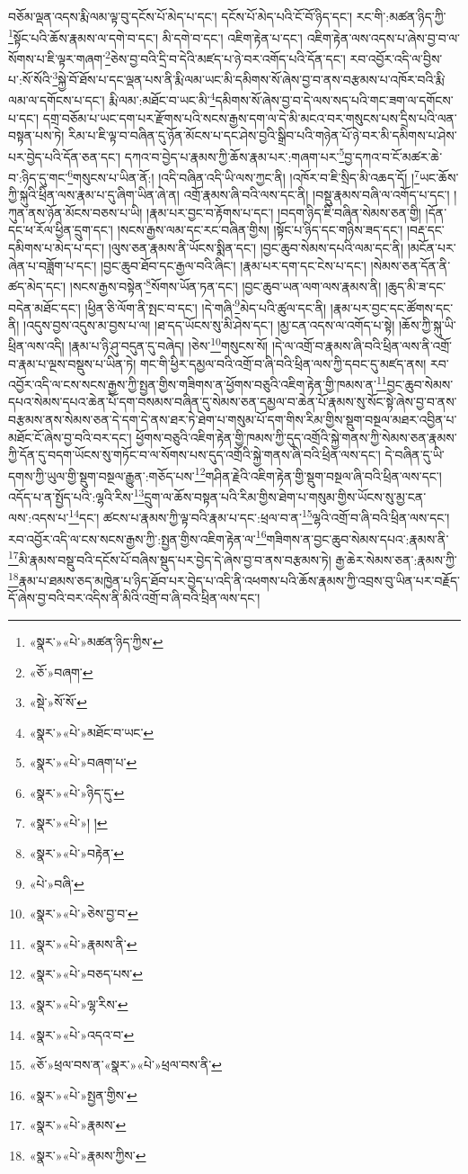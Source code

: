བཅོམ་ལྡན་འདས་རྨི་ལམ་ལྟ་བུ་དངོས་པོ་མེད་པ་དང་། དངོས་པོ་མེད་པའི་ངོ་བོ་ཉིད་དང་། རང་གི་:མཚན་ཉིད་ཀྱི་\footnote{«སྣར་»«པེ་»མཚན་ཉིད་ཀྱིས་}སྟོང་པའི་ཆོས་རྣམས་ལ་དགེ་བ་དང་། མི་དགེ་བ་དང་། འཇིག་རྟེན་པ་དང་། འཇིག་རྟེན་ལས་འདས་པ་ཞེས་བྱ་བ་ལ་སོགས་པ་ཇི་ལྟར་གཞག་\footnote{«ཅོ་»བཞག་}ཅེས་བྱ་བའི་དྲི་བ་དེའི་མཛད་པ་ཉེ་བར་འགོད་པའི་དོན་དང་། རབ་འབྱོར་འདི་ལ་བྱིས་པ་:སོ་སོའི་\footnote{«སྡེ་»སོ་སོ་}སྐྱེ་བོ་ཐོས་པ་དང་ལྡན་པས་ནི་རྨི་ལམ་ཡང་མི་དམིགས་སོ་ཞེས་བྱ་བ་ནས་བརྩམས་པ་འཁོར་བའི་རྨི་ལམ་ལ་དགོངས་པ་དང་། རྨི་ལམ་:མཐོང་བ་ཡང་མི་\footnote{«སྣར་»«པེ་»མཐོང་བ་ཡང་}དམིགས་སོ་ཞེས་བྱ་བ་དེ་ལས་སད་པའི་གང་ཟག་ལ་དགོངས་པ་དང་། དགྲ་བཅོམ་པ་ཡང་དག་པར་རྫོགས་པའི་སངས་རྒྱས་དག་ལ་དེ་མི་མངའ་བར་གསུངས་པས་དྲིས་པའི་ལན་བསྟན་པས་ཏེ། རིམ་པ་ཇི་ལྟ་བ་བཞིན་དུ་ཉོན་མོངས་པ་དང་ཤེས་བྱའི་སྒྲིབ་པའི་གཉེན་པོ་ཉེ་བར་མི་དམིགས་པ་ཤེས་པར་བྱེད་པའི་དོན་ཅན་དང་། དཀའ་བ་བྱེད་པ་རྣམས་ཀྱི་ཆོས་རྣམ་པར་:གཞག་པར་\footnote{«སྣར་»«པེ་»བཞག་པ་}བྱ་དཀའ་བ་ངོ་མཚར་ཆེ་བ་:ཉིད་དུ་གང་\footnote{«སྣར་»«པེ་»ཉིད་དུ་}གསུངས་པ་ཡིན་ནོ:། །འདི་བཞིན་འདི་ཡི་ལས་ཀྱང་ནི། །འཁོར་བ་ཇི་སྲིད་མི་འཆད་དོ། །\footnote{«སྣར་»«པེ་»། །}ཡང་ཆོས་ཀྱི་སྐུའི་ཕྲིན་ལས་རྣམ་པ་དུ་ཞིག་ཡིན་ཞེ་ན། འགྲོ་རྣམས་ཞི་བའི་ལས་དང་ནི། །བསྡུ་རྣམས་བཞི་ལ་འགོད་པ་དང་། །ཀུན་ནས་ཉོན་མོངས་བཅས་པ་ཡི། །རྣམ་པར་བྱང་བ་རྟོགས་པ་དང་། །བདག་ཉིད་ཇི་བཞིན་སེམས་ཅན་གྱི། །དོན་དང་ཕ་རོལ་ཕྱིན་དྲུག་དང་། །སངས་རྒྱས་ལམ་དང་རང་བཞིན་གྱིས། །སྟོང་པ་ཉིད་དང་གཉིས་ཟད་དང་། །བརྡ་དང་དམིགས་པ་མེད་པ་དང་། །ལུས་ཅན་རྣམས་ནི་ཡོངས་སྨིན་དང་། །བྱང་ཆུབ་སེམས་དཔའི་ལམ་དང་ནི། །མངོན་པར་ཞེན་པ་བཟློག་པ་དང་། །བྱང་ཆུབ་ཐོབ་དང་རྒྱལ་བའི་ཞིང་། །རྣམ་པར་དག་དང་ངེས་པ་དང་། །སེམས་ཅན་དོན་ནི་ཚད་མེད་དང་། །སངས་རྒྱས་བསྟེན་\footnote{«སྣར་»«པེ་»བརྟེན་}སོགས་ཡོན་ཏན་དང་། །བྱང་ཆུབ་ཡན་ལག་ལས་རྣམས་ནི། །ཆུད་མི་ཟ་དང་བདེན་མཐོང་དང་། །ཕྱིན་ཅི་ལོག་ནི་སྤང་བ་དང་། །དེ་གཞི་\footnote{«པེ་»བཞི་}མེད་པའི་ཚུལ་དང་ནི། །རྣམ་པར་བྱང་དང་ཚོགས་དང་ནི། །འདུས་བྱས་འདུས་མ་བྱས་པ་ལ། །ཐ་དད་ཡོངས་སུ་མི་ཤེས་དང་། །མྱ་ངན་འདས་ལ་འགོད་པ་སྟེ། །ཆོས་ཀྱི་སྐུ་ཡི་ཕྲིན་ལས་འདི། །རྣམ་པ་ཉི་ཤུ་བདུན་དུ་བཞེད། །ཅེས་\footnote{«སྣར་»«པེ་»ཅེས་བྱ་བ་}གསུངས་སོ། །དེ་ལ་འགྲོ་བ་རྣམས་ཞི་བའི་ཕྲིན་ལས་ནི་འགྲོ་བ་རྣམ་པ་ལྔས་བསྡུས་པ་ཡིན་ཏེ། གང་གི་ཕྱིར་དམྱལ་བའི་འགྲོ་བ་ཞི་བའི་ཕྲིན་ལས་ཀྱི་དབང་དུ་མཛད་ནས། རབ་འབྱོར་འདི་ལ་ངས་སངས་རྒྱས་ཀྱི་སྤྱན་གྱིས་གཟིགས་ན་ཕྱོགས་བཅུའི་འཇིག་རྟེན་གྱི་ཁམས་ན་\footnote{«སྣར་»«པེ་»རྣམས་ནི་}བྱང་ཆུབ་སེམས་དཔའ་སེམས་དཔའ་ཆེན་པོ་དག་བསམས་བཞིན་དུ་སེམས་ཅན་དམྱལ་བ་ཆེན་པོ་རྣམས་སུ་སོང་སྟེ་ཞེས་བྱ་བ་ནས་བརྩམས་ནས་སེམས་ཅན་དེ་དག་དེ་ནས་ཐར་ཏེ་ཐེག་པ་གསུམ་པོ་དག་གིས་རིམ་གྱིས་སྡུག་བསྔལ་མཐར་འབྱིན་པ་མཐོང་ངོ་ཞེས་བྱ་བའི་བར་དང་། ཕྱོགས་བཅུའི་འཇིག་རྟེན་གྱི་ཁམས་ཀྱི་དུད་འགྲོའི་སྐྱེ་གནས་ཀྱི་སེམས་ཅན་རྣམས་ཀྱི་དོན་དུ་བདག་ཡོངས་སུ་གཏོང་བ་ལ་སོགས་པས་དུད་འགྲོའི་སྐྱེ་གནས་ཞི་བའི་ཕྲིན་ལས་དང་། དེ་བཞིན་དུ་ཡི་དགས་ཀྱི་ཡུལ་གྱི་སྡུག་བསྔལ་རྒྱུན་:གཅོད་པས་\footnote{«སྣར་»«པེ་»བཅད་པས་}གཤིན་རྗེའི་འཇིག་རྟེན་གྱི་སྡུག་བསྔལ་ཞི་བའི་ཕྲིན་ལས་དང་། འདོད་པ་ན་སྤྱོད་པའི་:ལྷའི་རིས་\footnote{«སྣར་»«པེ་»ལྷ་རིས་}དྲུག་ལ་ཆོས་བསྟན་པའི་རིམ་གྱིས་ཐེག་པ་གསུམ་གྱིས་ཡོངས་སུ་མྱ་ངན་ལས་:འདས་པ་\footnote{«སྣར་»«པེ་»འདའ་བ་}དང་། ཚངས་པ་རྣམས་ཀྱི་ལྟ་བའི་རྣམ་པ་དང་:ཕྲལ་བ་ན་\footnote{«ཅོ་»ཕྲལ་བས་ན་«སྣར་»«པེ་»ཕྲལ་བས་ནི་}ལྷའི་འགྲོ་བ་ཞི་བའི་ཕྲིན་ལས་དང་། རབ་འབྱོར་འདི་ལ་ངས་སངས་རྒྱས་ཀྱི་:སྤྱན་གྱིས་འཇིག་རྟེན་ལ་\footnote{«སྣར་»«པེ་»སྤྱན་གྱིས་}གཟིགས་ན་བྱང་ཆུབ་སེམས་དཔའ་:རྣམས་ནི་\footnote{«སྣར་»«པེ་»རྣམས་}མི་རྣམས་བསྡུ་བའི་དངོས་པོ་བཞིས་སྡུད་པར་བྱེད་དེ་ཞེས་བྱ་བ་ནས་བརྩམས་ཏེ། རྒྱ་ཆེར་སེམས་ཅན་:རྣམས་ཀྱི་\footnote{«སྣར་»«པེ་»རྣམས་ཀྱིས་}རྣམ་པ་ཐམས་ཅད་མཁྱེན་པ་ཉིད་ཐོབ་པར་བྱེད་པ་འདི་ནི་འཕགས་པའི་ཆོས་རྣམས་ཀྱི་འབྲས་བུ་ཡིན་པར་བརྗོད་དོ་ཞེས་བྱ་བའི་བར་འདིས་ནི་མིའི་འགྲོ་བ་ཞི་བའི་ཕྲིན་ལས་དང་། 